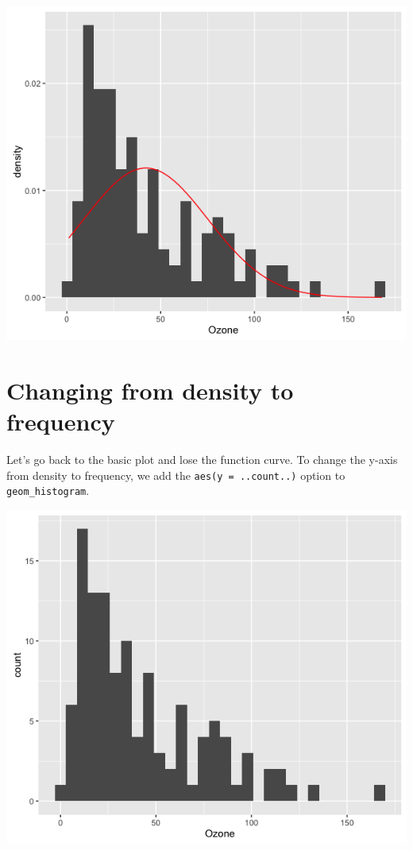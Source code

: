 \begin{center}\includegraphics[width=0.55\linewidth]{0_all_posts_pdf/histogram_2-1} \end{center}

\section{Changing from density to
frequency}\label{changing-from-density-to-frequency}

Let's go back to the basic plot and lose the function curve. To change
the y-axis from density to frequency, we add the
\texttt{aes(y\ =\ ..count..)} option to \texttt{geom\_histogram}.

\begin{Shaded}
\begin{Highlighting}[]
\StringTok{ }\NormalTok{(} \StringTok{ }
\StringTok{      }\NormalTok{(}\NormalTok{(} 
\end{Highlighting}
\end{Shaded}

\begin{center}\includegraphics[width=0.55\linewidth]{0_all_posts_pdf/histogram_3-1} \end{center}

